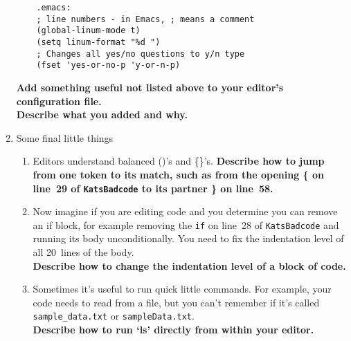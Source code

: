 \documentclass{article}
\begin{document}
\begin{enumerate}
\begin{lstlisting}
    .emacs:
    ; line numbers - in Emacs, ; means a comment
    (global-linum-mode t)
    (setq linum-format "%d ")
    ; Changes all yes/no questions to y/n type
    (fset 'yes-or-no-p 'y-or-n-p)
    \end{lstlisting}
    \textbf{Add something useful not listed above to your editor's configuration file.\\
      Describe  what you added and why.}
    \vspace{12em}
  \item Some final little things
    \small
    \begin{enumerate}
      \item Editors understand balanced ()'s and \{\}'s.
        \textbf{Describe how to jump from one token to its match, such as from
          the opening \{ on line~29 of \texttt{KatsBadcode} to its partner \}
          on line~58.
        }
        \vspace{4em}
      \item Now imagine if you are editing code and you determine you can
        remove an if block, for example removing the \texttt{if} on line~28 of
        \texttt{KatsBadcode} and running its body unconditionally. You need to
        fix the indentation level of all 20~lines of the body.\\
        \textbf{Describe how to change the indentation level of a block of code.}
        \vspace{4em}
      \item Sometimes it's useful to run quick little commands. For example,
        your code needs to read from a file, but you can't remember if it's
        called \texttt{sample\_data.txt} or \texttt{sampleData.txt}.\\
        \textbf{Describe how to run `ls' directly from within your editor.}
        \vspace{4em}
    \end{enumerate}
\end{enumerate}

\end{document}
